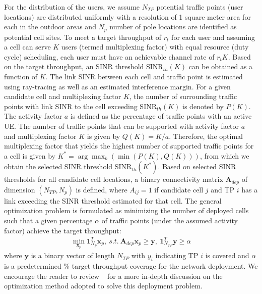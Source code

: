 {For the distribution of the users, we assume $N_{TP}$ potential traffic points (user locations) are distributed uniformly with a resolution of 1 square meter area for each in the outdoor areas and $N_p$ number of pole locations are identified as potential cell sites. To meet a target throughput of $r_t$ %
for each user and assuming a cell can serve $K$ users (termed multiplexing factor) with equal resource (duty cycle) scheduling, each user must have an achievable channel rate of $r_tK$. Based on the target throughput, an SINR threshold SINR$_{th}(K)$ can be obtained as a function of $K$.  %
The link SINR between each cell and traffic point is estimated using ray-tracing as well as an estimated interference margin. 
For a given candidate cell and multiplexing factor $K$, the number of surrounding traffic points with link SINR to the cell exceeding SINR$_{th}(K)$ is denoted by $P(K)$. 
The activity factor $a$ is defined as the percentage of traffic points with an active UE. The number of traffic points that can be supported with activity factor $a$ and multiplexing factor $K$ is given by $Q(K) = K/a$. 
Therefore, the optimal multiplexing factor that yields the highest number of supported traffic points for a cell is given by $K^{*} =  \arg\max_{k} (\min(P(K), Q(K)))$, from which we obtain the selected SINR threshold SINR$_{th}(K^{*})$. 
Based on selected SINR thresholds for all candidate cell locations, a binary connectivity matrix $\bm{A}_{dep}$ of dimension $(N_{TP},N_p)$ is defined, %
where $A_{ij} = 1$ if candidate cell $j$ and TP $i$ has a link exceeding the SINR threshold estimated for that cell.}
The general optimization problem is formulated as minimizing the number of deployed cells such that a given percentage $\alpha$ of traffic points (under the assumed activity factor) achieve the target throughput: 
\begin{align}\label{eq:deployment}
   \min_{\bm{x}_p} {\bm{1}^T_{N_p}}{\bm{x}_p} , ~s.t. ~ \bm{A}_{dep}\bm{x}_p \ge \bm{y}, ~ {\bm{1}^T_{N_{TP}}}\bm{y} \ge \alpha
\end{align}
{where $\bm{y}$ is a binary vector of length $N_{TP}$ with $y_i$ indicating TP $i$ is covered and $\alpha$ is a predetermined \% target throughput coverage for the network deployment. 
We encourage the reader to review ~\cite{deployement_paper} for a more in-depth discussion on the optimization method adopted to solve this deployment problem.}

